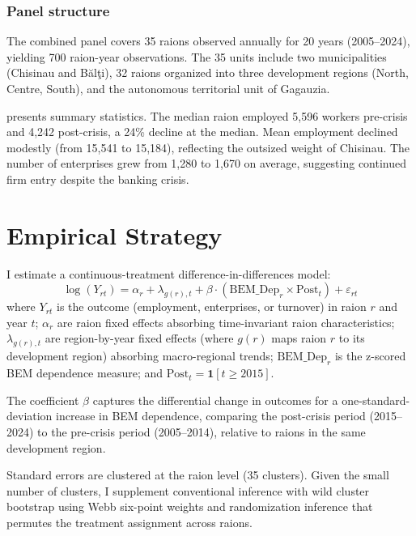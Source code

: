 \documentclass[12pt]{article}
\begin{document}
\subsubsection*{Panel structure} The combined panel covers 35 raions observed annually for 20 years (2005--2024), yielding 700 raion-year observations. The 35 units include two municipalities (Chisinau and B\u{a}l\c{t}i), 32 raions organized into three development regions (North, Centre, South), and the autonomous territorial unit of Gagauzia.



 presents summary statistics. The median raion employed 5,596 workers pre-crisis and 4,242 post-crisis, a 24\% decline at the median. Mean employment declined modestly (from 15,541 to 15,184), reflecting the outsized weight of Chisinau. The number of enterprises grew from 1,280 to 1,670 on average, suggesting continued firm entry despite the banking crisis.


\section{Empirical Strategy}
\label{sec:strategy}

I estimate a continuous-treatment difference-in-differences model:
\begin{equation}
\log(Y_{rt}) = \alpha_r + \lambda_{g(r),t} + \beta \cdot (\text{BEM\_Dep}_r \times \text{Post}_t) + \varepsilon_{rt}
\label{eq:main}
\end{equation}
where $Y_{rt}$ is the outcome (employment, enterprises, or turnover) in raion $r$ and year $t$; $\alpha_r$ are raion fixed effects absorbing time-invariant raion characteristics; $\lambda_{g(r),t}$ are region-by-year fixed effects (where $g(r)$ maps raion $r$ to its development region) absorbing macro-regional trends; $\text{BEM\_Dep}_r$ is the z-scored BEM dependence measure; and $\text{Post}_t = \mathbf{1}[t \geq 2015]$.

The coefficient $\beta$ captures the differential change in outcomes for a one-standard-deviation increase in BEM dependence, comparing the post-crisis period (2015--2024) to the pre-crisis period (2005--2014), relative to raions in the same development region.

Standard errors are clustered at the raion level (35 clusters). Given the small number of clusters, I supplement conventional inference with wild cluster bootstrap \citep{cameron2008bootstrap} using Webb six-point weights and randomization inference that permutes the treatment assignment across raions.
\end{document}
